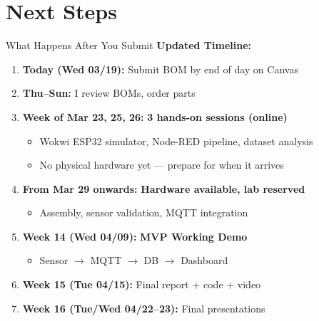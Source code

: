 \documentclass[aspectratio=169,11pt]{beamer}
\begin{document}
\section{Next Steps}

\begin{frame}[shrink=5]{What Happens After You Submit}
    \textbf{Updated Timeline:}
    
    \vspace{0.15cm}
    \begin{enumerate}
        \item \textbf{Today (Wed 03/19):} Submit BOM by end of day on Canvas
        
        \item \textbf{Thu--Sun:} I review BOMs, order parts
        
        \item \textbf{Week of Mar 23, 25, 26:} \textbf{3 hands-on sessions (online)}
        \begin{itemize}
            \item Wokwi ESP32 simulator, Node-RED pipeline, dataset analysis
            \item No physical hardware yet --- prepare for when it arrives
        \end{itemize}
        
        \item \textbf{From Mar 29 onwards:} \textbf{Hardware available, lab reserved}
        \begin{itemize}
            \item Assembly, sensor validation, MQTT integration
        \end{itemize}
        
        \item \textbf{Week 14 (Wed 04/09):} \textbf{MVP Working Demo}
        \begin{itemize}
            \item Sensor $\rightarrow$ MQTT $\rightarrow$ DB $\rightarrow$ Dashboard
        \end{itemize}
        
        \item \textbf{Week 15 (Tue 04/15):} Final report + code + video
        
        \item \textbf{Week 16 (Tue/Wed 04/22--23):} Final presentations
    \end{enumerate}
\end{frame}
\end{document}
